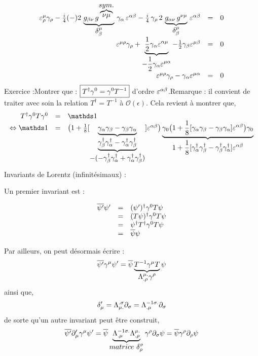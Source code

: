 \[
\begin{array}{ r c l }
\varepsilon^\mu_\rho\gamma_\rho-\frac{i}{4}(-)2\,\underbrace{g_{\beta\nu}\,g^{\overbrace{\nu\mu}^{\displaystyle {sym.}}}}_{\displaystyle {\delta^\mu_\beta}}\,\gamma_\alpha\,\varepsilon^{\alpha\beta}-\frac{i}{4}\,\gamma_\rho\,2\,\underbrace{g_{\alpha\nu}\,g^{\nu\mu}}_{\displaystyle {\delta^\mu_\beta}}\,\varepsilon^{\alpha\beta} & = & 0 \\
\varepsilon^{\mu\rho}\gamma_\rho+\underbrace{\frac{1}{2}\gamma_\alpha\varepsilon^{\alpha\mu}}_{\displaystyle {-\frac{1}{2}\gamma_\alpha\varepsilon^{\mu\alpha}}}
 -\frac{1}{2}\gamma_\beta\varepsilon^{\mu\beta} & = & 0 \\
\varepsilon^{\mu\rho}\gamma_\rho-\gamma_\alpha\varepsilon^{\mu\alpha} & = & 0 \\
\end{array}
\]
Exercice :Montrer que : $\boxed{T^{\dagger}\gamma^{0}=\gamma^{0}T^{-1}}$ d’ordre $\varepsilon^{\alpha
\beta}$.Remarque : il convient de traiter avec soin la relation
$T^{\dagger}=T^{-1}$ à $\mathcal{O}(\epsilon)$.
Cela revient à montrer que,
\[
\begin{array}{ r c l }
 T^\dagger\g^0T\g^0 & = & \Id \\ \ssi\Id & = & \big(1+\frac{1}{8}[
 \ub{\gai\gbi-\gbi\gai}{\ub{\gbid\gaid-\gaid\gbid}{-(-\gbid\gaid+\gaid\gbid)}}
]\e^{\a\b}\big)
\ub{\g_0\big(1+\frac{1}{8}[\gai\gbi-\gbi\gai]\e^{\a\b}\big)\g_0}
 {1+\frac{1}{8}[\gaid\gbid-\gbid\gaid]\e^{\a\b}} \\
\end{array}
\]
Invariants de Lorentz (infinitésimaux) :

Un premier invariant est :

\[
\begin{array}{ r c l }
 \overline{\psi'}\psi' & = & (\psi')^\dagger\gamma^0T\psi \\
 & = & (T\psi)^\dagger\gamma^0T\psi \\
 & = & \psi^\dagger T^\dagger\gamma^0T\psi \\
 & = & \overline{\psi}\psi \\
\end{array}
\]

Par ailleurs, on peut désormais écrire :
\[
\overline{\psi'}\gamma^\mu\psi' = \overline{\psi}\underbrace{T^{-1}\gamma^\mu T}_{\displaystyle {\Lambda^{\mu.}_{.\rho}\gamma^\rho}}\psi
\]
ainsi que,
\[
\delta'_\mu=\Lambda^{.\sigma}_{\mu.}\partial_\sigma=\Lambda^{-1\sigma.}_{.\mu}\partial_\sigma
\]
de sorte qu’un autre invariant peut être construit,
\[
\overline{\psi'}\dm'\gm\psi' = \overline{\psi}\ub{\Lambda^{-1\s.}_{.\mu}\Lambda^{\mu.}_{.\r}}{matrice\ \delta^\s_\r}\gr\ds\psi = 
\overline{\psi}\gr\dr\psi
\]
